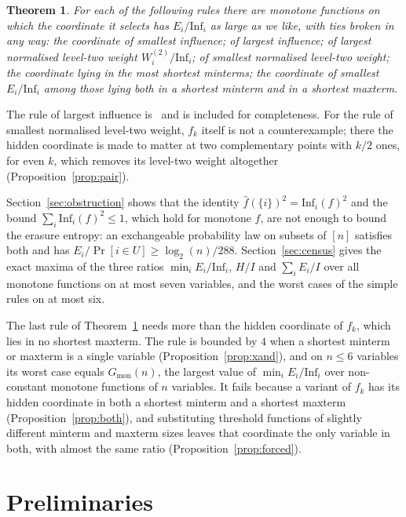 \documentclass[11pt]{amsart}
\newtheorem{theorem}{Theorem}
\theoremstyle{remark}
\newcommand{\Inf}{\mathrm{Inf}}
\begin{document}
\begin{theorem}\label{thm:rules}
For each of the following rules there are monotone functions on which the coordinate it selects has $E_i/\Inf_i$ as
large as we like, with ties broken in any way: the coordinate of smallest influence; of largest influence; of largest
normalised level-two weight $W^{(2)}_i/\Inf_i$; of smallest normalised level-two weight; the coordinate lying in the
most shortest minterms; the coordinate of smallest $E_i/\Inf_i$ among those lying both in a shortest minterm and in a
shortest maxterm.
\end{theorem}

The rule of largest influence is~\cite[Proposition~5.1]{Shm3} and is included for completeness. For the rule of
smallest normalised level-two weight, $f_k$ itself is not a counterexample; there the hidden coordinate is made to
matter at two complementary points with $k/2$ ones, for even $k$, which removes its level-two weight altogether
(Proposition~\ref{prop:pair}).

Section~\ref{sec:obstruction} shows that the identity $\hat f(\{i\})^2=\Inf_i(f)^2$ and the bound
$\sum_i\Inf_i(f)^2\le1$, which hold for monotone $f$, are not enough to bound the erasure entropy: an exchangeable
probability law on subsets of $[n]$ satisfies both and has $E_i/\Pr[i\in U]\ge\log_2(n)/288$. Section~\ref{sec:census}
gives the exact maxima of the three ratios $\min_iE_i/\Inf_i$, $H/I$ and $\sum_iE_i/I$ over all monotone functions on
at most seven variables, and the worst cases of the simple rules on at most six.

The last rule of Theorem~\ref{thm:rules} needs more than the hidden coordinate of $f_k$, which lies in no shortest
maxterm. The rule is bounded by $4$ when a shortest minterm or maxterm is a single variable
(Proposition~\ref{prop:xand}), and on $n\le6$ variables its worst case equals $G_{\mathrm{mon}}(n)$, the largest value
of $\min_iE_i/\Inf_i$ over non-constant monotone functions of $n$ variables. It fails
because a variant of $f_k$ has its hidden coordinate in both a shortest minterm and a shortest maxterm
(Proposition~\ref{prop:both}), and substituting threshold functions of slightly different minterm and maxterm sizes
leaves that coordinate the only variable in both, with almost the same ratio (Proposition~\ref{prop:forced}).

\section{Preliminaries}\label{sec:prelim}
\end{document}
